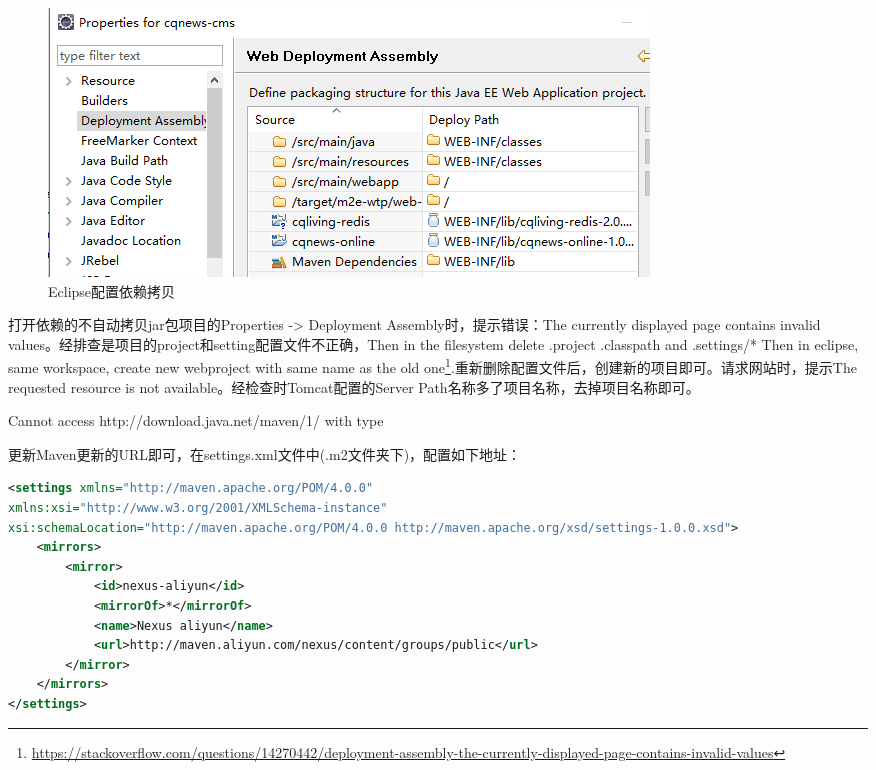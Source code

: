 \documentclass[12pt]{book}
\makeatletter
\numberwithin{dummy}{section}
\theoremstyle{ocrenumbox}
\theoremstyle{blacknumex}
\theoremstyle{blacknumbox}
\theoremstyle{ocrenum}
\renewcommand{\subsection}{\@startsection {subsection}{2}{\z@}
	{-3ex \@plus -0.1ex \@minus -.4ex}
	{0.5ex \@plus.2ex }
	{\normalfont\sffamily\bfseries}}
\makeatother
\begin{document}
\begin{figure}[htbp]
	\centering
	\includegraphics[scale=0.45]{assemblydeployment.png}
	\caption{Eclipse配置依赖拷贝}
	\label{fig:assemblydeployment}
\end{figure}

打开依赖的不自动拷贝jar包项目的Properties -> Deployment Assembly时，提示错误：The currently displayed page contains invalid values。经排查是项目的project和setting配置文件不正确，Then in the filesystem delete .project .classpath and .settings/* Then in eclipse, same workspace, create new webproject with same name as the old one\footnote{\url{https://stackoverflow.com/questions/14270442/deployment-assembly-the-currently-displayed-page-contains-invalid-values}}.重新删除配置文件后，创建新的项目即可。请求网站时，提示The requested resource is not available。经检查时Tomcat配置的Server Path名称多了项目名称，去掉项目名称即可。



\subsection{Cannot access http://download.java.net/maven/1/ with type}

更新Maven更新的URL即可，在settings.xml文件中(.m2文件夹下)，配置如下地址：


\begin{lstlisting}[language=XML]
<settings xmlns="http://maven.apache.org/POM/4.0.0"    
xmlns:xsi="http://www.w3.org/2001/XMLSchema-instance"    
xsi:schemaLocation="http://maven.apache.org/POM/4.0.0 http://maven.apache.org/xsd/settings-1.0.0.xsd"> 
	<mirrors>
		<mirror>
			<id>nexus-aliyun</id>
			<mirrorOf>*</mirrorOf>
			<name>Nexus aliyun</name>
			<url>http://maven.aliyun.com/nexus/content/groups/public</url>
		</mirror>        
	</mirrors>
</settings>
\end{lstlisting}
\end{document}
